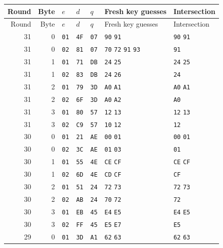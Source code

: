\begingroup\small
\begin{longtable}{rrlllll}
\toprule
Round & Byte & $e$ & $d$ & $q$ & Fresh key guesses & Intersection\\
\midrule
\endfirsthead
\toprule
Round & Byte & $e$ & $d$ & $q$ & Fresh key guesses & Intersection\\
\midrule
\endhead
31 & 0 & \texttt{01} & \texttt{4F} & \texttt{07} & \texttt{90} \texttt{91} & \texttt{90} \texttt{91}\\
31 & 0 & \texttt{02} & \texttt{81} & \texttt{07} & \texttt{70} \texttt{72} \texttt{91} \texttt{93} & \texttt{91}\\
31 & 1 & \texttt{01} & \texttt{71} & \texttt{DB} & \texttt{24} \texttt{25} & \texttt{24} \texttt{25}\\
31 & 1 & \texttt{02} & \texttt{83} & \texttt{DB} & \texttt{24} \texttt{26} & \texttt{24}\\
31 & 2 & \texttt{01} & \texttt{79} & \texttt{3D} & \texttt{A0} \texttt{A1} & \texttt{A0} \texttt{A1}\\
31 & 2 & \texttt{02} & \texttt{6F} & \texttt{3D} & \texttt{A0} \texttt{A2} & \texttt{A0}\\
31 & 3 & \texttt{01} & \texttt{80} & \texttt{57} & \texttt{12} \texttt{13} & \texttt{12} \texttt{13}\\
31 & 3 & \texttt{02} & \texttt{C9} & \texttt{57} & \texttt{10} \texttt{12} & \texttt{12}\\
30 & 0 & \texttt{01} & \texttt{21} & \texttt{AE} & \texttt{00} \texttt{01} & \texttt{00} \texttt{01}\\
30 & 0 & \texttt{02} & \texttt{3C} & \texttt{AE} & \texttt{01} \texttt{03} & \texttt{01}\\
30 & 1 & \texttt{01} & \texttt{55} & \texttt{4E} & \texttt{CE} \texttt{CF} & \texttt{CE} \texttt{CF}\\
30 & 1 & \texttt{02} & \texttt{6D} & \texttt{4E} & \texttt{CD} \texttt{CF} & \texttt{CF}\\
30 & 2 & \texttt{01} & \texttt{51} & \texttt{24} & \texttt{72} \texttt{73} & \texttt{72} \texttt{73}\\
30 & 2 & \texttt{02} & \texttt{AB} & \texttt{24} & \texttt{70} \texttt{72} & \texttt{72}\\
30 & 3 & \texttt{01} & \texttt{EB} & \texttt{45} & \texttt{E4} \texttt{E5} & \texttt{E4} \texttt{E5}\\
30 & 3 & \texttt{02} & \texttt{FF} & \texttt{45} & \texttt{E5} \texttt{E7} & \texttt{E5}\\
29 & 0 & \texttt{01} & \texttt{3D} & \texttt{A1} & \texttt{62} \texttt{63} & \texttt{62} \texttt{63}\\

\end{longtable}
